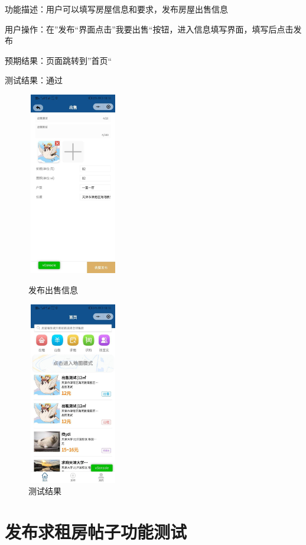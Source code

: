 功能描述：用户可以填写房屋信息和要求，发布房屋出售信息

用户操作：在”发布“界面点击”我要出售“按钮，进入信息填写界面，填写后点击发布

预期结果：页面跳转到”首页“

测试结果：通过
\newpage 
    \begin{figure}[htbp]
        \centering
        \begin{minipage}[t]{0.48\textwidth}
        \centering
        \includegraphics[width=4cm,height=8cm]{test/image/test28.png} 
     
       \caption{发布出售信息} 
        \end{minipage}
        \begin{minipage}[t]{0.48\textwidth}
        \centering
        \includegraphics[width=4cm,height=8cm]{test/image/test29.png}
        \caption{测试结果}
        \end{minipage}
        \end{figure}

   \section{发布求租房帖子功能测试}

